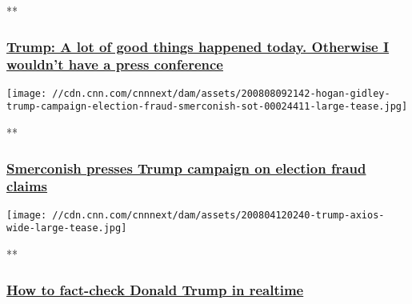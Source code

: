 **

\hypertarget{trump-a-lot-of-good-things-happened-today-otherwise-i-wouldnt-have-a-press-conference}{%
\subsubsection{\texorpdfstring{\href{/videos/politics/2020/08/08/trump-comments-bedminster-before-press-conference-sot-ctn-vpx.cnn/video/playlists/this-week-in-politics/}{Trump:
A lot of good things happened today. Otherwise I wouldn't have a press
conference}}{Trump: A lot of good things happened today. Otherwise I wouldn't have a press conference}}\label{trump-a-lot-of-good-things-happened-today-otherwise-i-wouldnt-have-a-press-conference}}

\href{/videos/politics/2020/08/08/hogan-gidley-trump-campaign-election-fraud-smerconish-sot.cnn/video/playlists/this-week-in-politics/}{}

\texttt{[image: //cdn.cnn.com/cnnnext/dam/assets/200808092142-hogan-gidley-trump-campaign-election-fraud-smerconish-sot-00024411-large-tease.jpg]}

**

\hypertarget{smerconish-presses-trump-campaign-on-election-fraud-claims-}{%
\subsubsection{\texorpdfstring{\href{/videos/politics/2020/08/08/hogan-gidley-trump-campaign-election-fraud-smerconish-sot.cnn/video/playlists/this-week-in-politics/}{Smerconish
presses Trump campaign on election fraud claims
}}{Smerconish presses Trump campaign on election fraud claims }}\label{smerconish-presses-trump-campaign-on-election-fraud-claims-}}

\href{/videos/politics/2020/08/08/donald-trump-realtime-fact-checking-facts-first-orig-vf.cnn/video/playlists/this-week-in-politics/}{}

\texttt{[image: //cdn.cnn.com/cnnnext/dam/assets/200804120240-trump-axios-wide-large-tease.jpg]}

**

\hypertarget{how-to-fact-check-donald-trump-in-realtime}{%
\subsubsection{\texorpdfstring{\href{/videos/politics/2020/08/08/donald-trump-realtime-fact-checking-facts-first-orig-vf.cnn/video/playlists/this-week-in-politics/}{How
to fact-check Donald Trump in
realtime}}{How to fact-check Donald Trump in realtime}}\label{how-to-fact-check-donald-trump-in-realtime}}

